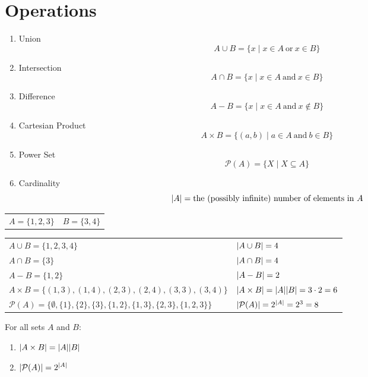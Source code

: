 \documentclass[letterpaper,12pt,fleqn]{article}
\newcommand{\E}{\emptyset}
\renewcommand{\P}{\mathcal{P}}
\begin{document}
\section*{Operations}
\begin{enumerate}
\item Union
\[A\cup B=\{x\mid x\in A\ \mbox{or}\ x\in B\}\]
\item Intersection
\[A\cap B=\{x\mid x\in A\ \mbox{and}\ x\in B\}\]
\item Difference
\[A-B=\{x\mid x\in A\ \mbox{and}\ x\notin B\}\]
\item Cartesian Product
\[A\times B=\{(a,b)\mid a\in A\ \mbox{and}\ b\in B\}\]
\item Power Set
\[\P(A)=\{X\mid X\subseteq A\}\]
\item Cardinality
\[\lvert A\rvert=\mbox{the (possibly infinite) number of elements in $A$}\]
\end{enumerate}
\begin{example}
\begin{tabular}{cc}
$A=\{1,2,3\}$ & $B=\{3,4\}$ \\
\end{tabular}

\begin{tabular}{ll}
$A\cup B=\{1,2,3,4\}$ & $\lvert A\cup B\rvert=4$ \\
$A\cap B=\{3\}$ & $\lvert A\cap B\rvert=4$ \\
$A-B=\{1,2\}$ & $\lvert A-B\rvert=2$ \\
$A\times B=\{(1,3),(1,4),(2,3),(2,4),(3,3),(3,4)\}$ &
    $\lvert A\times B\rvert=\lvert A\rvert\lvert B\rvert=3\cdot2=6$ \\
$\P(A)=\{\E,\{1\},\{2\},\{3\},\{1,2\},\{1,3\},\{2,3\},\{1,2,3\}\}$ &
    $\abs{\P(A)}=2^{\abs{A}}=2^3=8$ \\
\end{tabular}
\end{example}
\begin{theorem}
For all sets $A$ and $B$:
\begin{enumerate}
\item $\lvert A\times B\rvert=\lvert A\rvert\lvert B\rvert$
\item $\abs{\P(A)}=2^{\abs{A}}$
\end{enumerate}
\end{theorem}
\end{document}
